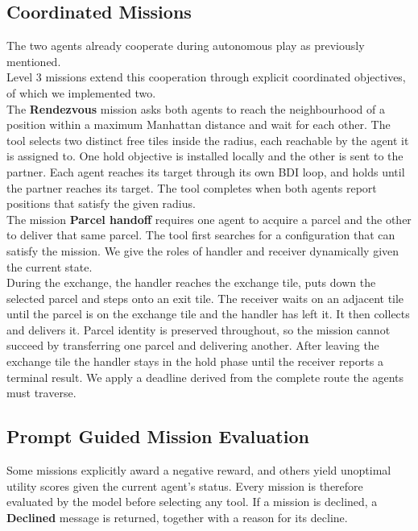 \documentclass[11pt,a4paper]{article}
\begin{document}
\subsection{Coordinated Missions}
The two agents already cooperate during autonomous play as previously mentioned.
\\Level 3 missions extend this cooperation through explicit coordinated objectives, of which we implemented two.
\\The \textbf{Rendezvous} mission asks both agents to reach the neighbourhood of a position within a maximum Manhattan distance and wait for each other.
The tool selects two distinct free tiles inside the radius, each reachable by the agent it is assigned to.
One hold objective is installed locally and the other is sent to the partner. Each agent reaches its target through its own BDI loop, and holds until the partner reaches its target.
The tool completes when both agents report positions that satisfy the given radius.
\\The mission \textbf{Parcel handoff} requires one agent to acquire a parcel and the other to deliver that same parcel.
The tool first searches for a configuration that can satisfy the mission. 
We give the roles of handler and receiver dynamically given the current state.
\\During the exchange, the handler reaches the exchange tile, puts down the selected parcel and steps onto an exit tile.
The receiver waits on an adjacent tile until the parcel is on the exchange tile and the handler has left it. It then collects and delivers it.
Parcel identity is preserved throughout, so the mission cannot succeed by transferring one parcel and delivering another.
After leaving the exchange tile the handler stays in the hold phase until the receiver reports a terminal result.
We apply a deadline derived from the complete route the agents must traverse.

\subsection{Prompt Guided Mission Evaluation}
Some missions explicitly award a negative reward, and others yield unoptimal utility scores given the current agent's status.
Every mission is therefore evaluated by the model before selecting any tool.
If a mission is declined, a \textbf{Declined} message is returned, together with a reason for its decline.
\end{document}
